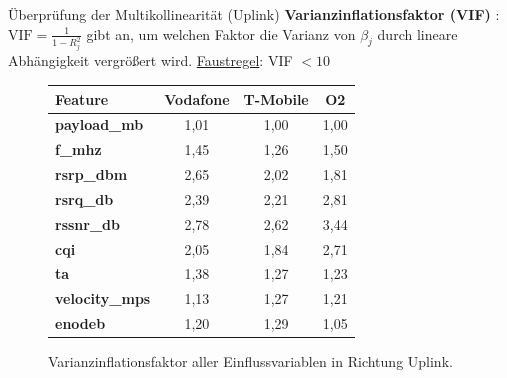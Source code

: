\documentclass[10pt]{beamer}
\begin{document}
\begin{frame}{Überprüfung der Multikollinearität (Uplink)}
	\textbf{Varianzinflationsfaktor (VIF)} \cite{fahrmeir_regression}:\\
	$\text{VIF}=\frac{1}{1-R^2_j}$ gibt an, um welchen Faktor die Varianz von $\beta_j$ durch lineare Abhängigkeit vergrößert wird. \underline{Faustregel}: VIF $<10$
	\begin{figure}
		\begin{table}
			\begin{tabular}{l||c|c|c}
				\textbf{Feature} & \textbf{Vodafone} & \textbf{T-Mobile} & \textbf{O2} \\
				\hline\hline
				\textbf{payload\_mb} & 1,01 & 1,00 & 1,00 \\
				\textbf{f\_mhz} & 1,45 & 1,26 & 1,50 \\
				\textbf{rsrp\_dbm} & 2,65 & 2,02 & 1,81 \\
				\textbf{rsrq\_db} & 2,39 & 2,21 & 2,81 \\
				\textbf{rssnr\_db} & 2,78 & 2,62 & 3,44 \\
				\textbf{cqi} & 2,05 & 1,84 & 2,71 \\
				\textbf{ta} & 1,38 & 1,27 & 1,23 \\
				\textbf{velocity\_mps} & 1,13 & 1,27 & 1,21 \\
				\textbf{enodeb} & 1,20 & 1,29 & 1,05 \\
			\end{tabular}%
		\end{table}
		\caption{Varianzinflationsfaktor aller Einflussvariablen in Richtung Uplink.}
	\end{figure}
\end{frame}
\end{document}
